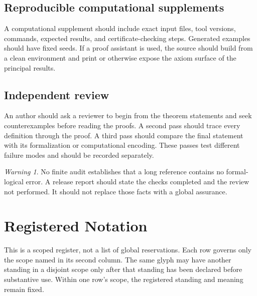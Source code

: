 \documentclass[11pt,oneside,openany]{book}
\theoremstyle{definition}
\theoremstyle{plain}
\theoremstyle{remark}
\newtheorem{warning}[definition]{Warning}
\begin{document}
\section{Reproducible computational supplements}
\label{sec:research-workflow-03}

A computational supplement should include exact input files, tool versions,
commands, expected results, and certificate-checking steps.  Generated examples
should have fixed seeds.  If a proof assistant is used, the source should build
from a clean environment and print or otherwise expose the axiom surface of the
principal results.

\section{Independent review}
\label{sec:research-workflow-04}

An author should ask a reviewer to begin from the theorem statements and seek
counterexamples before reading the proofs.  A second pass should trace every
definition through the proof.  A third pass should compare the final statement
with its formalization or computational encoding.  These passes test different
failure modes and should be recorded separately.

\begin{warning}
No finite audit establishes that a long reference contains no formal-logical
error.  A release report should state the checks completed and the review not
performed.  It should not replace those facts with a global assurance.
\end{warning}

\appendix

\chapter{Registered Notation}
\label{ch:registered-notation}
\label{app:notation}

This is a scoped register, not a list of global reservations.  Each row governs
only the scope named in its second column.  The same glyph may have another
standing in a disjoint scope only after that standing has been declared before
substantive use.  Within one row's scope, the registered standing and meaning
remain fixed.
\end{document}
